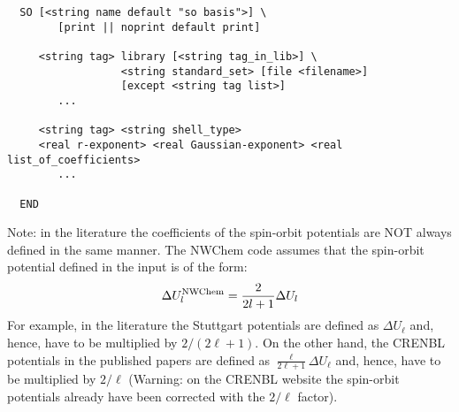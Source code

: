 \begin{verbatim}
  SO [<string name default "so basis">] \
        [print || noprint default print]

     <string tag> library [<string tag_in_lib>] \
                  <string standard_set> [file <filename>]
                  [except <string tag list>]
        ...

     <string tag> <string shell_type>
     <real r-exponent> <real Gaussian-exponent> <real list_of_coefficients>
        ...
     
  END
\end{verbatim}    

Note: in the literature the coefficients of the spin-orbit potentials are NOT 
always defined in the same manner. The NWChem code assumes that the spin-orbit
potential defined in the input is of the form:
\begin{equation}
\Delta U^{\rm NWChem}_{\ell} = \frac{2}{2\ell+1} \Delta U_{\ell} 
\end{equation}
For example, in the literature the Stuttgart potentials are defined as 
$\Delta U_{\ell}$ and, hence, have to be multiplied by $2/(2{\ell}+1)$. On the 
other hand, the CRENBL potentials in the published papers are defined as 
$\frac{\ell}{2\ell+1} \Delta U_{\ell}$ and, hence, have to be multiplied by 
$2/{\ell}$ (Warning: on the CRENBL website the spin-orbit potentials already
have been corrected with the $2/{\ell}$ factor).


